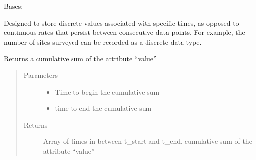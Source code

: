 \documentclass[letterpaper,10pt,english]{sphinxmanual}
\begin{document}

\begin{fulllineitems}
\label{\detokenize{index:feast.EmissionSimModules.result_classes.ResultDiscrete}}
Bases: {\hyperref[\detokenize{index:feast.EmissionSimModules.result_classes.ResultAggregate}]{}}

Designed to store discrete values associated with specific times, as opposed to continuous rates that persist
between consecutive data points. For example, the number of sites surveyed can be recorded as a discrete data type.

\begin{fulllineitems}
\label{\detokenize{index:feast.EmissionSimModules.result_classes.ResultDiscrete.get_cumulative_vals}}
Returns a cumulative sum of the attribute “value”
\begin{quote}\begin{description}
\item[{Parameters}] \leavevmode\begin{itemize}
\item {} 
 \textendash{} Time to begin the cumulative sum

\item {} 
 \textendash{} time to end the cumulative sum

\end{itemize}

\item[{Returns}] \leavevmode
Array of times in between t\_start and t\_end, cumulative sum of the attribute “value”

\end{description}\end{quote}

\end{fulllineitems}


\end{fulllineitems}
\end{document}
